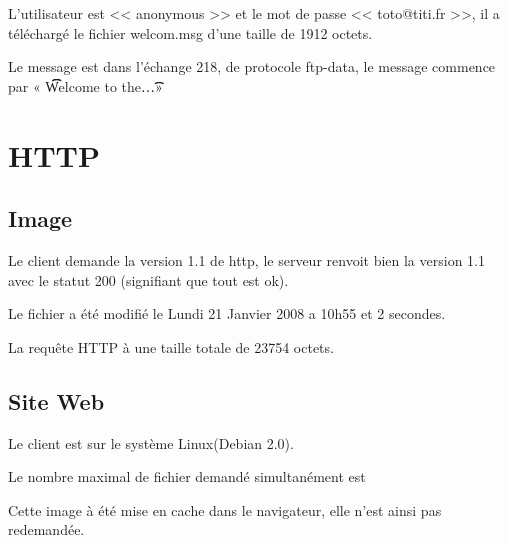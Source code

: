 \documentclass[12pt,a4paper,openany]{article}
\begin{document}
	L'utilisateur est << anonymous >> et le mot de passe << toto@titi.fr >>, il a téléchargé le fichier welcom.msg d'une taille de 1912 octets.
	
	Le message est dans l'échange 218, de protocole ftp-data, le message commence par « \t\t\t Welcome to the\n\n\t\t\ldots » 

	\section{HTTP}
	\subsection{Image}
	Le client demande la version 1.1 de http, le serveur renvoit bien la version 1.1 avec le statut 200 (signifiant que tout est ok).

	Le fichier a été modifié le Lundi 21 Janvier 2008 a 10h55 et 2 secondes.

	La requête HTTP à une taille totale de 23754 octets.

	\subsection{Site Web}
	Le client est sur le système Linux(Debian 2.0). 

	Le nombre maximal de fichier demandé simultanément est 

	Cette image à été mise en cache dans le navigateur, elle n'est ainsi pas redemandée.
	
\end{document}
